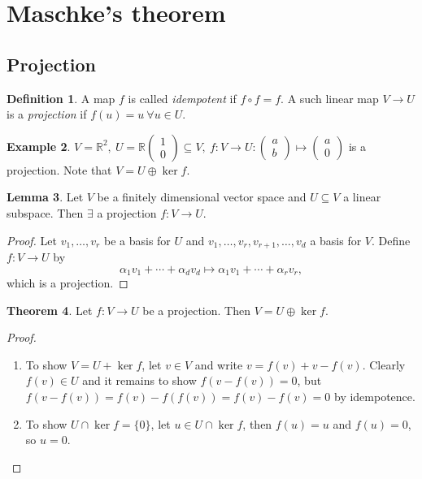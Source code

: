 \documentclass{article}
\newcommand{\R}{\mathbb{R}}
\theoremstyle{definition}
\newtheorem{defn}{Definition}[subsection]
\newtheorem{thm}[defn]{Theorem}
\newtheorem{lemma}[defn]{Lemma}
\newtheorem{example}[defn]{Example}
\begin{document}
\section{Maschke's theorem}
\subsection{Projection}
\begin{defn}
A map $f$ is called \textit{idempotent} if $f\circ f=f$. A such linear map $V\rightarrow U$ is a \textit{projection} if $f(u)=u \ \forall u\in U$.
\end{defn}
\begin{example}
$V=\R^2,\ U=\R\begin{pmatrix}1\\0\end{pmatrix}\subseteq V,\ f:V\rightarrow U:\begin{pmatrix}a\\b\end{pmatrix}\mapsto\begin{pmatrix}a\\0\end{pmatrix}$ is a projection. Note that $V=U\oplus\ker f$.
\end{example}

\begin{lemma}
Let $V$ be a finitely dimensional vector space and $U\subseteq V$ a linear subspace. Then $\exists $ a projection $f:V\rightarrow U$.
\end{lemma}
\begin{proof}
Let $v_1,\ldots,v_r$ be a basis for $U$ and $v_1,\ldots,v_r,v_{r+1},\ldots,v_d$ a basis for $V$. Define $f:V\rightarrow U$ by
\[
\alpha_1 v_1+\cdots+\alpha_d v_d \mapsto \alpha_1 v_1+\cdots+\alpha_r v_r,
\]
which is a projection.
\end{proof}

\begin{thm}
\label{thm:fprojimpVisUopkerf}
Let $f:V\rightarrow U$ be a projection. Then $V=U\oplus\ker f$.
\end{thm}
\begin{proof}
\begin{enumerate}
\item To show $V=U+\ker f$, let $v\in V$ and write $v=f(v)+v-f(v)$. Clearly $f(v)\in U$ and it remains to show $f(v-f(v))=0$, but $f(v-f(v))=f(v)-f(f(v))=f(v)-f(v)=0$ by idempotence.
\item To show $U\cap\ker f=\{0\}$, let $u\in U\cap\ker f$, then $f(u)=u$ and $f(u)=0$, so $u=0$.
\end{enumerate}
\end{proof}
\end{document}
